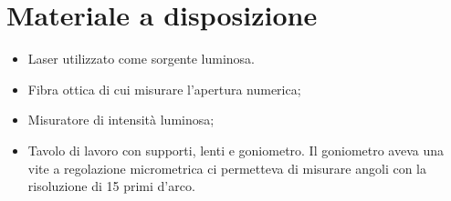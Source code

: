 \section{Materiale a disposizione}

\begin{itemize}
    \item{Laser utilizzato come sorgente luminosa.}
    \item{Fibra ottica di cui misurare l'apertura numerica;}
	\item{Misuratore di intensità luminosa;}
	\item{Tavolo di lavoro con supporti, lenti e goniometro. Il goniometro aveva una vite a regolazione micrometrica
        ci permetteva di misurare angoli con la risoluzione di 15 primi d'arco.}
\end{itemize}

